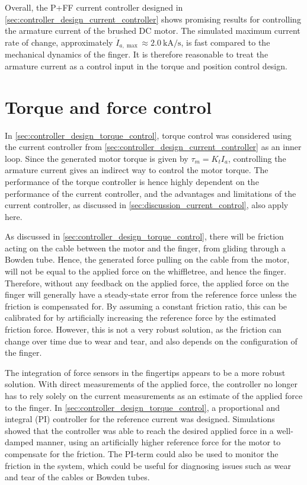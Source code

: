 Overall, the P+FF current controller designed in \cref{sec:controller_design_current_controller} shows promising results for controlling the armature current of the brushed DC motor. The simulated maximum current rate of change, approximately $\dot{I}_{a,\max} \approx \SI{2.0}{\kilo\ampere\per\second}$, is fast compared to the mechanical dynamics of the finger. It is therefore reasonable to treat the armature current as a control input in the torque and position control design.

\section{Torque and force control}%
\label{sec:discussion_torque_control}

In \cref{sec:controller_design_torque_control}, torque control was considered using the current controller from \cref{sec:controller_design_current_controller} as an inner loop. Since the generated motor torque is given by $\tau_m = K_t I_a$, controlling the armature current gives an indirect way to control the motor torque. The performance of the torque controller is hence highly dependent on the performance of the current controller, and the advantages and limitations of the current controller, as discussed in \cref{sec:discussion_current_control}, also apply here.

As discussed in \cref{sec:controller_design_torque_control}, there will be friction acting on the cable between the motor and the finger, from gliding through a Bowden tube. Hence, the generated force pulling on the cable from the motor, will not be equal to the applied force on the whiffletree, and hence the finger. Therefore, without any feedback on the applied force, the applied force on the finger will generally have a steady-state error from the reference force unless the friction is compensated for. By assuming a constant friction ratio, this can be calibrated for by artificially increasing the reference force by the estimated friction force. However, this is not a very robust solution, as the friction can change over time due to wear and tear, and also depends on the configuration of the finger.

The integration of force sensors in the fingertips appears to be a more robust solution. With direct measurements of the applied force, the controller no longer has to rely solely on the current measurements as an estimate of the applied force to the finger. In \cref{sec:controller_design_torque_control}, a proportional and integral (PI) controller for the reference current was designed. Simulations showed that the controller was able to reach the desired applied force in a well-damped manner, using an artificially higher reference force for the motor to compensate for the friction. The PI-term could also be used to monitor the friction in the system, which could be useful for diagnosing issues such as wear and tear of the cables or Bowden tubes. 

